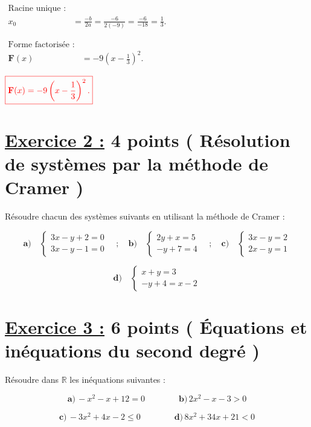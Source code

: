 \documentclass[12pt,a4paper]{article}
\begin{document}
\begin{enumerate}
\(
\begin{aligned}
\text{Racine unique :} \\
x_0 &= \frac{-b}{2a} = \frac{-6}{2(-9)} = \frac{-6}{-18} = \frac{1}{3}.
\end{aligned}
\)

\(
\begin{aligned}
\text{Forme factorisée :} \\
\textbf{F}(x) &= -9(x - \frac{1}{3})^2.
\end{aligned}
\)

\(
\textcolor{red}{\boxed{\textbf{F}(x) = -9\left(x - \frac{1}{3}\right)^2.}}
\)

\end{enumerate}


\section*{\underline{Exercice 2 :} 4 points ( Résolution de systèmes par la méthode de Cramer )}
Résoudre chacun des systèmes suivants en utilisant la méthode de Cramer :

\[
\textbf{a)} \quad
\begin{cases}
3x - y + 2 = 0 \\
3x - y - 1 = 0
\end{cases}
\quad ; \quad
\textbf{b)} \quad
\begin{cases}
2y + x = 5 \\
-y + 7 = 4
\end{cases}
\quad ; \quad
\textbf{c)} \quad
\begin{cases}
3x - y = 2 \\
2x - y = 1
\end{cases}
\]

\[
\textbf{d)} \quad
\begin{cases}
x + y = 3 \\
-y + 4 = x - 2
\end{cases}
\]

\section*{\underline{Exercice 3 :} 6 points ( Équations et inéquations du second degré )}

Résoudre dans \(\mathbb{R}\) les inéquations suivantes :

\[
\textbf{a)} \, -x^2 - x + 12 = 0 \quad\quad \quad\quad\textbf{b)} \, 2x^2 - x - 3 > 0
\]

\[
\textbf{c)} \, -3x^2 + 4x - 2 \leq 0 \quad\quad\quad\quad \textbf{d)} \, 8x^2 + 34x + 21 < 0
\]
\end{document}
